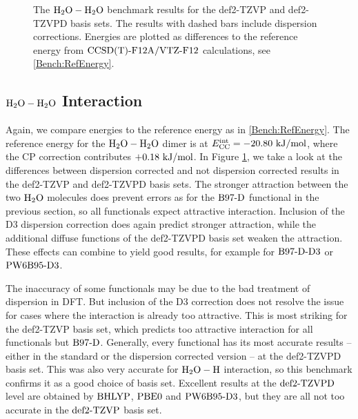 \documentclass[8.5pt,twoside,twocolumn]{article}
\newcommand\kmo{\enmat{\te {kJ/mol}}}
\theoremstyle{standard}
\begin{document}
\begin{figure}[h]
\caption{The $\mbox{\ensuremath{\text H _2 \text O-\text H _2 \text O}}$ benchmark results for the def2-TZVP and def2-TZVPD basis sets.
The results with dashed bars include dispersion corrections. Energies are plotted as differences
to the reference energy from $\text{CCSD(T)-F12A}/\text{VTZ-F}12$ calculations, see \eqref{Bench:RefEnergy}.}
\label{Fig:Bench:H2O+H2O:TZVPCompare}
\end{figure}

\subsection{$\mbox{\ensuremath{\text H _2 \text O-\text H _2 \text O}}$ Interaction}

Again, we compare energies to the reference energy as in \eqref{Bench:RefEnergy}. The
reference energy for the $\mbox{\ensuremath{\text H _2 \text O-\text H _2 \text O}}$ dimer is at \mbox{$\ecc=-20.80\ \kmo$}, where
the CP correction contributes $+0.18\ \kmo$.
In Figure \ref{Fig:Bench:H2O+H2O:TZVPCompare}, we take a look at the differences between
dispersion corrected and not dispersion corrected results in the def2-TZVP and def2-TZVPD
basis sets. The stronger attraction between the two $\text H _2 \text O$ molecules does prevent
errors as for the $\text{B97-D}$ functional in the previous section, so all functionals
expect attractive interaction. Inclusion of the D3 dispersion correction does again
predict stronger attraction, while the additional diffuse functions of the
def2-TZVPD basis set weaken the attraction. These effects can combine to
yield good results, for example for $\text{B97-D}\text{-D3}$ or $\text{PW6B95}\text{-D3}$.

The inaccuracy of some functionals may be due to the bad treatment of
dispersion in DFT. But inclusion of the D3 correction does not resolve the issue for cases
where the interaction is already too attractive. This
is most striking for the def2-TZVP basis set, which predicts too attractive
interaction for all functionals but $\text{B97-D}$. Generally, every functional has its
most accurate results -- either in the standard or the dispersion corrected version --
at the def2-TZVPD basis set. This was also very accurate for $\mbox{\ensuremath{\text H _2 \text O-\text H}}$ interaction,
so this benchmark confirms it as a good choice of basis set. Excellent
results at the $\text{def2-TZVPD}$ level are obtained by $\text{BHLYP}$, $\text{PBE0}$ and $\text{PW6B95}\text{-D3}$,
but they are all not too accurate in the $\text{def2-TZVP}$ basis set.  
\end{document}
